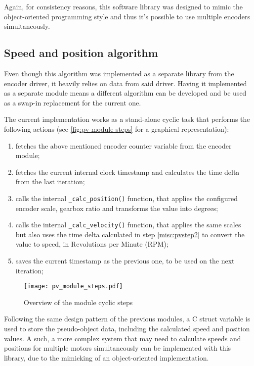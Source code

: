 Again, for consistency reasons, this software library was designed to mimic the object-oriented programming style and thus it's possible to use multiple encoders simultaneously.

\subsection{Speed and position algorithm} \label{speed-algorithm}
Even though this algorithm was implemented as a separate library from the encoder driver, it heavily relies on data from said driver.
Having it implemented as a separate module means a different algorithm can be developed and be used as a swap-in replacement for the current one.

The current implementation works as a stand-alone cyclic task that performs the following actions (see \autoref{fig:pv-module-steps} for a graphical representation):
\begin{enumerate}
	\item fetches the above mentioned encoder counter variable from the encoder module;
	\item fetches the current internal clock timestamp and calculates the time delta from the last iteration; \label{misc:pvstep2}
	\item calls the internal \verb|_calc_position()| function, that applies the configured encoder scale, gearbox ratio and transforms the value into degrees;
	\item calls the internal \verb|_calc_velocity()| function, that applies the same scales but also uses the time delta calculated in step \ref{misc:pvstep2} to convert the value to speed, in Revolutions per Minute (RPM);
	\item saves the current timestamp as the previous one, to be used on the next iteration;
\end{enumerate}

\begin{figure}[htp]
	\centering
	\texttt{[image: pv\_module\_steps.pdf]}
	\caption{Overview of the module cyclic steps}
	\label{fig:pv-module-steps}
\end{figure}

Following the same design pattern of the previous modules, a C struct variable is used to store the pseudo-object data, including the calculated speed and position values.
A such, a more complex system that may need to calculate speeds and positions for multiple motors simultaneously can be implemented with this library, due to the mimicking of an object-oriented implementation.


